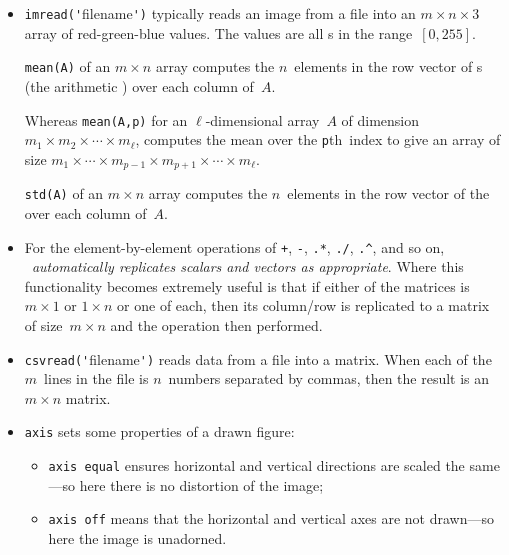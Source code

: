 \begin{itemize}
\begin{itemize}
\item  {}\verb|imread('|filename\verb|')| typically reads an image from a file into an \(m\times n\times 3\) array of red-green-blue values. 
The values are all s in the range~\([0,255]\).

\itemme {}\verb|mean(A)| of an \(m\times n\) array computes the \(n\)~elements in the row vector of s (the arithmetic ) over each column of~\(A\).

Whereas \verb|mean(A,p)| for an \(\ell\)-dimensional array~\(A\) of dimension \(m_1\times m_2\times\cdots\times m_\ell\),  computes the mean over the \verb|p|th~index to give an array of size \(m_1\times\cdots\times m_{p-1}\times m_{p+1}\times\cdots\times m_\ell\).

\itemme {}\verb|std(A)| of an \(m\times n\) array computes the \(n\)~elements in the row vector of the  over each column of~\(A\).

\item For the element-by-element operations of \verb|+|, \verb|-|, \verb|.*|, \verb|./|, \verb|.^|, and so on, \emph{\script\ automatically replicates scalars and vectors as appropriate}.
Where this functionality becomes extremely useful is that if either  of the matrices is \(m\times1\) or \(1\times n\) or one of each, then its column\slash row is replicated to a matrix of size~\(m\times n\) and the operation then performed. 

\item  {}\verb|csvread('|filename\verb|')| reads data from a file into a matrix.
When each of the \(m\)~lines in the file is \(n\)~numbers separated by commas, then the result is an \(m\times n\) matrix. 


\item {}\verb|axis| sets some properties of a drawn figure:
\begin{itemize}
\item \verb|axis equal| ensures horizontal and vertical directions are scaled the same---so here there is no distortion of the image;
\item \verb|axis off| means that the horizontal and vertical axes are not drawn---so here the image is unadorned.
\end{itemize}
\end{itemize}





\end{itemize}
